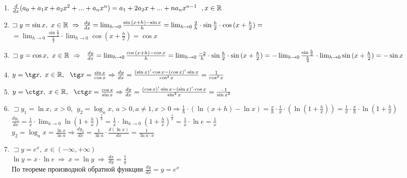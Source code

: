 \documentclass{article}
\begin{document}
\begin{enumerate}
	\item $\frac{d}{dx} (a_0 + a_1x + a_2x^2 + ... + a_nx^n) = a_1 + 2a_2x + ... + na_nx^{n-1} \ \ ,x \in \mathbb{R}$

	\item $\sqsupset y = \sin{x}, \ x \in \R \ \Rightarrow \ \frac{dy}{dx} = \lim_{h \to 0} \frac{\sin{(x+h)} - \sin{x}}{h} = \lim_{h \to 0} \frac{2}{h} \cdot \sin{\frac{h}{2}} \cdot \cos{(x + \frac{h}{2})} =$ \\
	      $= \lim_{h \to 0} \frac{\sin{\frac{h}{2}}}{\frac{h}{2}} \cdot \lim_{h \to 0} \cos{(x + \frac{h}{2})}= \cos{x}$

	\item $\sqsupset y = \cos{x}, \ x \in \R \ \Rightarrow \ \ \frac{dy}{dx} = \lim_{h \to 0} \frac{\cos{(x+h)} - \cos{x}}{h} = \lim_{h \to 0} \frac{-2}{h} \cdot \sin{\frac{h}{2}} \cdot \sin{(x + \frac{h}{2})} = -\lim_{h \to 0} \frac{\sin{\frac{h}{2}}}{\frac{h}{2}} \cdot \lim_{h \to 0} \sin{(x + \frac{h}{2})}= -\sin{x}$

	\item $y = \tg x, \ x \in \R, \ \ \tg x = \frac{\sin{x}}{\cos{x}} \Rightarrow \frac{dy}{dx} = \frac{ (\sin{x})' \cdot \cos{x} - (\cos{x})' \cdot \sin{x} }{\cos^2{x}} = \frac{1}{\cos^2{x}}$

	\item $y = \ctg x, \ x \in \R, \ \ \ctg x = \frac{\cos{x}}{\sin{x}} \Rightarrow \frac{dy}{dx} = \frac{ (\cos{x})' \cdot \sin{x} - (\sin{x})' \cdot \cos{x} }{\sin^2{x}}= \frac{-1}{{\sin{x}}^2}$

	\item $\sqsupset y_1 = \ln x, \ x > 0, \ \ y_2 = \log_{a} x, \ a > 0, a \neq 1, x > 0 \Rightarrow \frac{1}{h} \cdot (\ln (x+h) - \ln x) = \frac{x}{h} \cdot \frac{1}{x} \cdot (\ln (1+\frac{h}{x})) = \frac{1}{x} \cdot \frac{x}{h} \cdot \ln (1+\frac{h}{x})$ \\
	      $\frac{dy_1}{dx} = \frac{1}{x} \cdot \lim_{h \to 0} \ln {(1 + \frac{h}{x})}^{\frac{x}{h}} = \frac{1}{x} \cdot \ln_{h \to 0} {(1+\frac{h}{x})}^{\frac{x}{h}} = \frac{1}{x} \cdot \ln e = \frac{1}{x}$ \\
	      $y_2 = \log_{a} x = \frac{\ln x}{\ln a} \Rightarrow \frac{dy_2}{dx} = \frac{1}{\ln a} \cdot \frac{d(\ln x)}{dx} = \frac{1}{\ln a \cdot x}$

	\item $\sqsupset y = e^x, \ x \in (-\infty, +\infty)$ \\
	      $\ln y = x \cdot \ln e \ \Rightarrow \ x = \ln y \ \Rightarrow \ \frac{dx}{dy} = \frac{1}{y}$ \\
	      По теореме производной обратной функции $\frac{dy}{dx} = y = e^x$


\end{enumerate}
\end{document}
